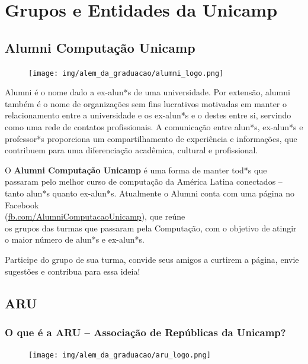 
\section{Grupos e Entidades da Unicamp}

\subsection{Alumni Computação Unicamp}

\begin{figure}[H]
  \centering
  \texttt{[image: img/alem\_da\_graduacao/alumni\_logo.png]}
\end{figure}

Alumni é o nome dado a ex-alun*s de uma universidade. Por extensão, alumni
também é o nome de organizações sem fins lucrativos motivadas em manter o
relacionamento entre a universidade e os ex-alun*s e o destes entre si,
servindo como uma rede de contatos profissionais. A comunicação entre alun*s,
ex-alun*s e professor*s proporciona um compartilhamento de experiência e
informações, que contribuem para uma diferenciação acadêmica, cultural e
profissional.

O \textbf{Alumni Computação Unicamp} é uma forma de manter tod*s que passaram
pelo melhor curso de computação da América Latina conectados -- tanto alun*s
quanto ex-alun*s. Atualmente o Alumni conta com uma página no Facebook
\\(\url{fb.com/AlumniComputacaoUnicamp}), que reúne\\os grupos das turmas que
passaram pela Computação, com o objetivo de atingir o maior número de alun*s e
ex-alun*s.

Participe do grupo de sua turma, convide seus amigos a curtirem a página, envie
sugestões e contribua para essa ideia!

\subsection{ARU}

\subsubsection{O que é a ARU – Associação de Repúblicas da Unicamp?}

\begin{figure}[H]
  \centering
  \texttt{[image: img/alem\_da\_graduacao/aru\_logo.png]}
\end{figure}

